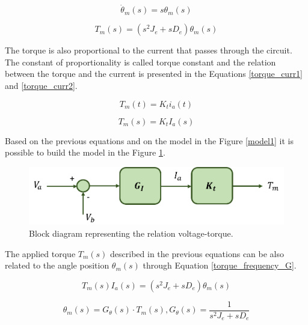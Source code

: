 \begin{equation}\label{theta_relation}
\dot{\theta}_{m}(s)= s\theta_{m}(s)
\end{equation}

\begin{equation}\label{torque_frequency_theta}
T_{m}(s)= (s^{2}J_{e} + sD_{e})\theta_{m}(s)
\end{equation}

The torque is also proportional to the current that passes through the circuit. The constant of proportionality is called torque constant and the relation between the torque and the current is presented in the Equations \ref{torque_curr1} and \ref{torque_curr2}.

\begin{equation}\label{torque_curr1}
T_{m}(t)= K_{t} i_{a}(t)
\end{equation}

\begin{equation}\label{torque_curr2}
T_{m}(s)= K_{t} I_{a}(s)
\end{equation}

Based on the previous equations and on the model in the Figure \ref{model1} it is possible to build the model in the Figure \ref{model2}.

\begin{figure}[H]
\centering
\includegraphics[scale=0.6]{figures/model2.png}
\caption{Block diagram representing the relation voltage-torque.}
\label{model2}
\end{figure}

The applied torque $T_{m}(s)$ described in the previous equations can be also related to the angle position $\theta_{m}(s)$ through Equation \ref{torque_frequency_G}.

\begin{equation*}
	T_{m}(s) I_{a}(s)= (s^{2}J_{e} + sD_{e})\theta_{m}(s)
\end{equation*}

\begin{equation}\label{torque_frequency_G}
	\theta_{m}(s)= G_{\theta}(s)\cdot T_{m}(s) , G_{\theta}(s)=\frac{1}{s^{2}J_{e} + sD_{e}}
\end{equation}

